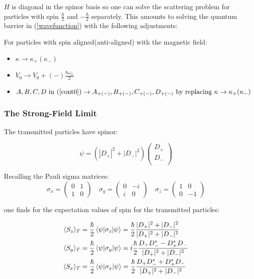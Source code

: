 \documentclass{article}
\begin{document}
\noindent $H$ is diagonal in the spinor basis so one can solve the scattering problem for particles with spin $\frac{\hbar}{2}$ and $-\frac{\hbar}{2}$ separately. This amounts to solving the quantum barrier in (\ref{wavefunction}) with the following adjustments:

For particles with spin aligned(anti-aligned) with the magnetic field:

\begin{itemize}
	\item $\kappa \to \kappa_{+}(\kappa_{-})$
	\item $V_0 \to V_0+(-)\frac{\hbar \omega_L}{2}$
	\item $A,B,C,D \text{ in } (\ref{cont0}) \to A_{+(-)},B_{+(-)},C_{+(-)},D_{+(-)} \text{ by replacing } \kappa \to \kappa_{+}(\kappa_{-})$
\end{itemize}

\subsubsection{The Strong-Field Limit}
The transmitted particles have spinor:

\begin{equation}
	\psi = (|D_{+}|^2+|D_{-}|^2)
	\begin{pmatrix}
		D_{+}\\
		D_{-}\\
	\end{pmatrix}
\end{equation}

\noindent Recalling the Pauli sigma matrices:
\begin{equation}
	\sigma_x = 
	\begin{pmatrix}
		0&1\\
		1&0
	\end{pmatrix} \quad
	\sigma_y = 
	\begin{pmatrix}
		0&-i\\
		i&0
	\end{pmatrix} \quad
	\sigma_z =
	\begin{pmatrix}
		1&0\\
		0&-1
	\end{pmatrix}
\end{equation}

\noindent one finds for the expectation values of spin for the transmitted particles:

\begin{align}
	\langle S_z \rangle_T &= \frac{\hbar}{2}\braket{\psi|\sigma_z|\psi}=\frac{\hbar}{2}\frac{|D_+|^2+|D_-|^2}{|D_+|^2+|D_-|^2} \\
	\langle S_y \rangle_T &= \frac{\hbar}{2}\braket{\psi|\sigma_y|\psi}=i\frac{\hbar}{2}\frac{D_+D_-^*-D_+^*D_-}{|D_+|^2+|D_-|^2} \\
	\langle S_x \rangle_T &= \frac{\hbar}{2}\braket{\psi|\sigma_x|\psi}=\frac{\hbar}{2}\frac{D_+D_-^*+D_+^*D_-}{|D_+|^2+|D_-|^2}
\end{align}
\end{document}
